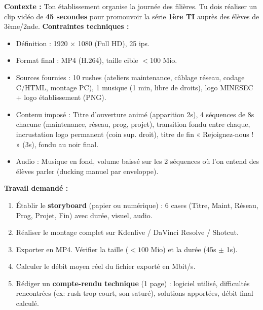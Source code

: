 \documentclass[11pt]{article}
\begin{document}
\begin{exercice}
\textbf{Contexte :} Ton établissement organise la journée des filières. Tu dois réaliser un clip vidéo de \textbf{45 secondes} pour promouvoir la série \textbf{1ère TI} auprès des élèves de 3ème/2nde.
\textbf{Contraintes techniques :}
\begin{itemize}
  \item Définition : 1920 $\times$ 1080 (Full HD), 25 ips.
  \item Format final : MP4 (H.264), taille cible $< 100$ Mio.
  \item Sources fournies : 10 rushes (ateliers maintenance, câblage réseau, codage C/HTML, montage PC), 1 musique (1 min, libre de droits), logo MINESEC + logo établissement (PNG).
  \item Contenu imposé : Titre d'ouverture animé (apparition 2s), 4 séquences de 8s chacune (maintenance, réseau, prog, projet), transition fondu entre chaque, incrustation logo permanent (coin sup. droit), titre de fin « Rejoignez-nous ! » (3s), fondu au noir final.
  \item Audio : Musique en fond, volume baissé sur les 2 séquences où l'on entend des élèves parler (ducking manuel par enveloppe).
\end{itemize}
\textbf{Travail demandé :}
\begin{enumerate}
  \item Établir le \textbf{storyboard} (papier ou numérique) : 6 cases (Titre, Maint, Réseau, Prog, Projet, Fin) avec durée, visuel, audio.
  \item Réaliser le montage complet sur Kdenlive / DaVinci Resolve / Shotcut.
  \item Exporter en MP4. Vérifier la taille ($< 100$ Mio) et la durée (45s $\pm$ 1s).
  \item Calculer le débit moyen réel du fichier exporté en Mbit/s.
  \item Rédiger un \textbf{compte-rendu technique} (1 page) : logiciel utilisé, difficultés rencontrées (ex: rush trop court, son saturé), solutions apportées, débit final calculé.
\end{enumerate}
\end{exercice}
\end{document}
